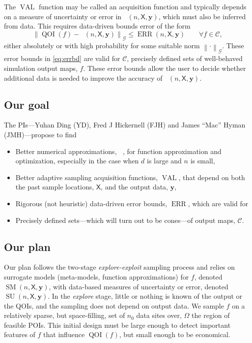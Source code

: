 \documentclass[11pt]{NSFamsart}
\DeclareMathOperator{\QOI}{QOI} %
\DeclareMathOperator{\APP}{\widehat{\QOI}}
\DeclareMathOperator{\SURR}{SM} %
\DeclareMathOperator{\ERR}{ERR}
\DeclareMathOperator{\VAL}{VAL}
\DeclareMathOperator{\SURRERR}{SU}
\newcommand{\mX}{\mathsf{X}}
\newcommand{\by}{{\boldsymbol{y}}}
\newcommand{\calc}{{\mathcal{C}}}
\newcommand{\calg}{{\mathcal{G}}}
\newcommand{\norm}[2][{}]{\ensuremath{\left \lVert #2 \right \rVert}_{#1}}
\newcommand{\bignorm}[2][{}]{\ensuremath{\bigl \lVert #2 \bigr \rVert}_{#1}}
\begin{document}
The $\VAL$ function may be called an acquisition function and typically depends on a measure of uncertainty or error in $\APP(n,\mX,\by)$, which must also be inferred from data.  This requires data-driven bounds error of the form 
\begin{equation} \label{eq:errbd}
    \bignorm[\calg]{\QOI(f) - \APP(n,\mX,\by)} \le \ERR(n,\mX,\by) \qquad \forall f \in \calc,
\end{equation}
either absolutely or with high probability for some suitable norm $\norm[\calg]{\cdot}$.  These error bounds in \eqref{eq:errbd} are valid for $\calc$,  precisely defined sets of well-behaved simulation output maps, $f$.  These error bounds allow the user to decide whether additional data is needed to improve the accuracy of $\APP(n,\mX,\by)$.


\subsection{Our goal}

The PIs---Yuhan Ding (YD), Fred J Hickernell (FJH) and James ``Mac'' Hyman (JMH)---propose to find
\begin{itemize}
    \item Better numerical approximations, $\APP$, for function approximation and optimization, especially in the case when $d$ is large and $n$ is small, 
    \item Better adaptive sampling acquisition functions, $\VAL$, that depend on both the past sample locations, $\mX$, and the output data, $\by$,
    \item Rigorous (not heuristic) data-driven error bounds, $\ERR$, which are valid for
    \item Precisely defined sets---which will turn out to be cones---of output maps, $\calc$.
\end{itemize}

\subsection{Our plan} \label{sec:OurPlan}

Our plan follows the two-stage \emph{explore-exploit} sampling process and relies on surrogate models (meta-models, function approximations) for $f$, denoted $\SURR(n,\mX,\by)$, with data-based measures of uncertainty or error, denoted $\SURRERR(n,\mX,\by)$.  In the \emph{explore} stage, little or nothing is known of the output or the QOIs, and the sampling does not depend on output data.  We sample $f$ on a relatively sparse, but space-filling, set of $n_0$ data sites over, $\Omega$ the region of feasible POIs.  This initial design must be large enough to detect important features of $f$ that influence $\QOI(f)$, but small enough to be economical. 
\end{document}
